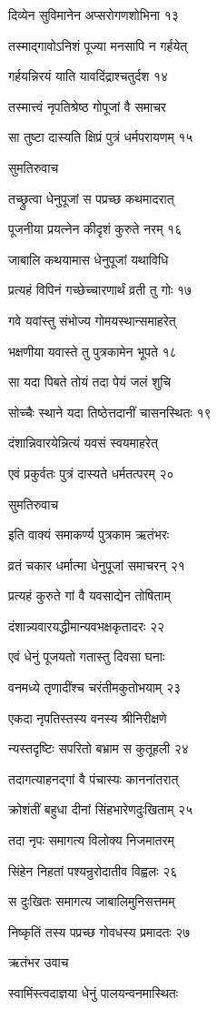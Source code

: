 दिव्येन सुविमानेन अप्सरोगणशोभिना १३

तस्माद्गावोऽनिशं पूज्या मनसापि न गर्हयेत्

गर्हयन्निरयं याति यावदिंद्राश्चतुर्दश १४

तस्मात्त्वं नृपतिश्रेष्ठ गोपूजां वै समाचर

सा तुष्टा दास्यति क्षिप्रं पुत्रं धर्मपरायणम् १५

सुमतिरुवाच

तच्छ्रुत्वा धेनुपूजां स पप्रच्छ कथमादरात्

पूजनीया प्रयत्नेन कीदृशं कुरुते नरम् १६

जाबालि कथयामास धेनुपूजां यथाविधि

प्रत्यहं विपिनं गच्छेच्चारणार्थं व्रती तु गोः १७

गवे यवांस्तु संभोज्य गोमयस्थान्समाहरेत्

भक्षणीया यवास्ते तु पुत्रकामेन भूपते १८

सा यदा पिबते तोयं तदा पेयं जलं शुचि

सोच्चैः स्थाने यदा तिष्ठेत्तदानीं चासनस्थितः १९

दंशान्निवारयेन्नित्यं यवसं स्वयमाहरेत्

एवं प्रकुर्वतः पुत्रं दास्यते धर्मतत्परम् २०

सुमतिरुवाच

इति वाक्यं समाकर्ण्य पुत्रकाम ऋतंभरः

व्रतं चकार धर्मात्मा धेनुपूजां समाचरन् २१

प्रत्यहं कुरुते गां वै यवसाद्येन तोषिताम्

दंशान्न्यवारयद्धीमान्यवभक्षकृतादरः २२

एवं धेनुं पूजयतो गतास्तु दिवसा घनाः

वनमध्ये तृणादींश्च चरंतीमकुतोभयाम् २३

एकदा नृपतिस्तस्य वनस्य श्रीनिरीक्षणे

न्यस्तदृष्टिः सपरितो बभ्राम स कुतूहली २४

तदागत्याहनद्गां वै पंचास्यः काननांतरात्

क्रोशंतीं बहुधा दीनां सिंहभारेणदुःखिताम् २५

तदा नृपः समागत्य विलोक्य निजमातरम्

सिंहेन निहतां पश्यन्रुरोदातीव विह्वलः २६

स दुःखितः समागत्य जाबालिमुनिसत्तमम्

निष्कृतिं तस्य पप्रच्छ गोवधस्य प्रमादतः २७

ऋतंभर उवाच

स्वामिंस्त्वदाज्ञया धेनुं पालयन्वनमास्थितः

